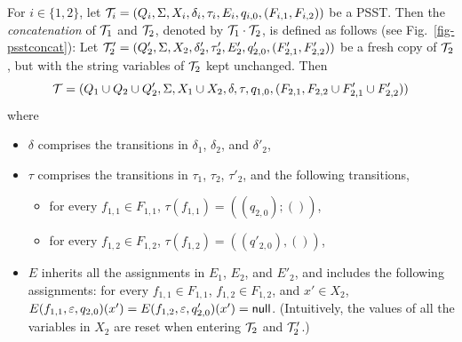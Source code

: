 \begin{definition}\label{def-psstconcat}
For $i \in \{1,2\}$, let $\mathcal{T}_i = (Q_i, \Sigma, X_i, \delta_i, \tau_i, E_i, q_{i,0}, (F_{i,1}, F_{i,2}))$ be a PSST. Then the \emph{concatenation} of $\mathcal{T}_1$ and $\mathcal{T}_2$, denoted by $\mathcal{T}_1 \cdot \mathcal{T}_2$, is defined as follows (see Fig.~\ref{fig-psstconcat}): 
Let  
$\mathcal{T}'_{2} = (Q'_{2}, \Sigma, X_{2}, \delta'_{2}, \tau'_{2}, E_{2}', q'_{2,0}, (F'_{2, 1}, F'_{2,2}))$ be a fresh copy of $\mathcal{T}_{2}$, but with the string variables of $\mathcal{T}_{2}$ kept unchanged. 
Then 
%
\[\mathcal{T} = ( Q_{1} \cup Q_{2} \cup Q'_{2}, \Sigma, X_1 \cup X_2, \delta, \tau, q_{1,0}, (F_{2,1}, F_{2,2} \cup F'_{2,1} \cup F'_{2,2}))\] 
where 
	\begin{itemize}
	\item $\delta$ comprises the transitions in $\delta_1$, $\delta_2$, and $\delta'_2$,
%
	\item $\tau$ comprises the transitions in $\tau_1$, $\tau_2$, $\tau'_2$, and the following transitions,
	\begin{itemize}
%
	\item for every $f_{1,1} \in F_{1,1}$, $\tau(f_{1,1}) = ((q_{2,0}); ())$, 
%
	\item for every $f_{1,2} \in F_{1,2}$, $\tau(f_{1,2}) = ((q'_{2,0}), ())$,
	\end{itemize}
	\item $E$ inherits all the assignments in $E_1$, $E_2$, and $E'_2$, and includes the following assignments:  for every $f_{1,1} \in F_{1,1}$, $f_{1,2} \in F_{1,2}$, and $x' \in X_2$, $E(f_{1,1}, \varepsilon, q_{2,0})(x') = E(f_{1,2}, \varepsilon, q'_{2,0})(x')= \mathsf{null}$. (Intuitively, the values of all the variables in $X_2$ are reset when entering $\mathcal{T}_2$ and $\mathcal{T}'_2$.)
  \end{itemize}
		\begin{figure}[tb]

\end{figure}
\end{definition}
